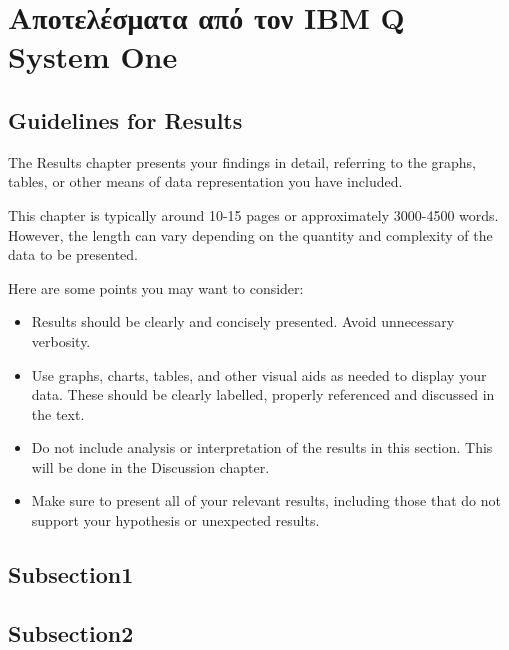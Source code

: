 \chapter{Αποτελέσματα από τον IBM Q System One}

\section*{Guidelines for Results}
The Results chapter presents your findings in detail, referring to the graphs, tables, or other means of data representation you have included. 

This chapter is typically around 10-15 pages or approximately 3000-4500 words. However, the length can vary depending on the quantity and complexity of the data to be presented.

Here are some points you may want to consider:
\begin{itemize}
    \item Results should be clearly and concisely presented. Avoid unnecessary verbosity.
    \item Use graphs, charts, tables, and other visual aids as needed to display your data. These should be clearly labelled, properly referenced and discussed in the text.
    \item Do not include analysis or interpretation of the results in this section. This will be done in the Discussion chapter.
    \item Make sure to present all of your relevant results, including those that do not support your hypothesis or unexpected results. 
\end{itemize}


\section{Subsection1}

\section{Subsection2}
